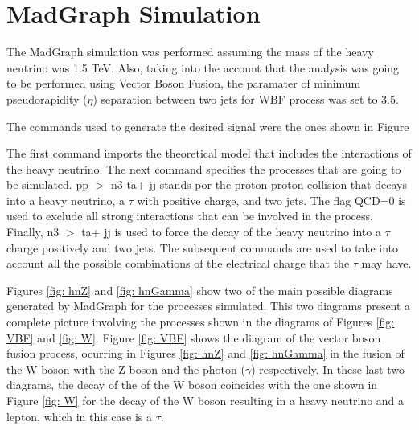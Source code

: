 \documentclass[12pt]{article}
\begin{document}
\section{MadGraph Simulation} \label{sec: mgsim}

The MadGraph simulation was performed assuming the mass of the heavy neutrino was 1.5 TeV. Also, taking into the account that the analysis was going to be performed using Vector Boson Fusion, the paramater of minimum pseudorapidity ($\eta$) separation between two jets for WBF process was set to 3.5.

The commands used to generate the desired signal were the ones shown in Figure

The first command imports the theoretical model that includes the interactions of the heavy neutrino. The next command specifies the processes that are going to be simulated. pp $>$ n3 ta+ jj stands por the proton-proton collision that decays into a heavy neutrino, a $\tau$ with positive charge, and two jets. The flag QCD=0 is used to exclude all strong interactions that can be involved in the process. Finally, n3 $>$ ta+ jj is used to force the decay of the heavy neutrino into a $\tau$ charge positively and two jets. The subsequent commands are used to take into account all the possible combinations of the electrical charge that the $\tau$ may have.

Figures \ref{fig: hnZ} and \ref{fig: hnGamma} show two of the main possible diagrams generated by MadGraph for the processes simulated. This two diagrams present a complete picture involving the processes shown in the diagrams of Figures \ref{fig: VBF} and \ref{fig: W}. Figure \ref{fig: VBF} shows the diagram of the vector boson fusion process, ocurring in Figures \ref{fig: hnZ} and \ref{fig: hnGamma} in the fusion of the W boson with the Z boson and the photon ($\gamma$) respectively. In these last two diagrams, the decay of the of the W boson coincides with the one shown in Figure \ref{fig: W} for the decay of the W boson resulting in a heavy neutrino and a lepton, which in this case is a $\tau$. 
\end{document}
